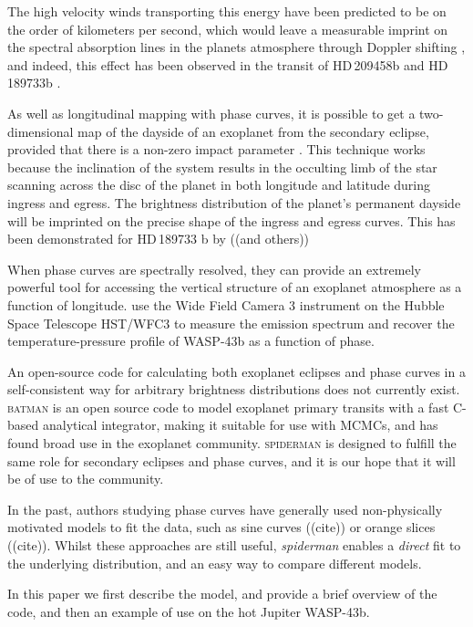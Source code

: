 \documentclass[a4paper,fleqn,usenatbib]{mnras}
\begin{document}
The high velocity winds transporting this energy have been predicted to be on the order of kilometers per second, which would leave a measurable imprint on the spectral absorption lines in the planets atmosphere through Doppler shifting \citep[e.g.][]{Showman2013}, and indeed, this effect has been observed in the transit of HD\,209458b \citep{Snellen2010} and HD\,189733b \citep{Louden2015}. 

As well as longitudinal mapping with phase curves, it is possible to get a two-dimensional map of the dayside of an exoplanet from the secondary eclipse, provided that there is a non-zero impact parameter \citep{Rauscher2007}. This technique works because the inclination of the system results in the occulting limb of the star scanning across the disc of the planet in both longitude and latitude during ingress and egress. The brightness distribution of the planet's permanent dayside will be imprinted on the precise shape of the ingress and egress curves. This has been demonstrated for HD\,189733 b by \citep{Majeau2012} ((and others))

When phase curves are spectrally resolved, they can provide an extremely powerful tool for accessing the vertical structure of an exoplanet atmosphere as a function of longitude. \citet{Stevenson2014} use the Wide Field Camera 3 instrument on the Hubble Space Telescope \textsc{HST}/WFC3 to measure the emission spectrum and recover the temperature-pressure profile of WASP-43b as a function of phase.


An open-source code for calculating both exoplanet eclipses and phase curves in a self-consistent way for arbitrary brightness distributions does not currently exist. \textsc{batman} \citep{Kreidberg2015a} is an open source code to model exoplanet primary transits with a fast C-based analytical integrator, making it suitable for use with MCMCs, and has found broad use in the exoplanet community. \textsc{spiderman} is designed to fulfill the same role for secondary eclipses and phase curves, and it is our hope that it will be of use to the community.

In the past, authors studying phase curves have generally used non-physically motivated models to fit the data, such as sine curves ((cite)) or orange slices ((cite)). Whilst these approaches are still useful, \emph{spiderman} enables a \emph{direct} fit to the underlying distribution, and an easy way to compare different models.

In this paper we first describe the model, and provide a brief overview of the code, and then an example of use on the hot Jupiter WASP-43b.
\end{document}
